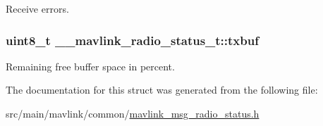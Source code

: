 Receive errors. 

\hypertarget{struct____mavlink__radio__status__t_a8f9a9b8d333b127422cb8d5b8b2b1928}{
\subsubsection[{txbuf}]{\setlength{\rightskip}{0pt plus 5cm}uint8\+\_\+t \+\_\+\+\_\+mavlink\+\_\+radio\+\_\+status\+\_\+t\+::txbuf}}\label{struct____mavlink__radio__status__t_a8f9a9b8d333b127422cb8d5b8b2b1928}


Remaining free buffer space in percent. 



The documentation for this struct was generated from the following file\+:\begin{DoxyCompactItemize}
\item 
src/main/mavlink/common/\hyperlink{mavlink__msg__radio__status_8h}{mavlink\+\_\+msg\+\_\+radio\+\_\+status.\+h}\end{DoxyCompactItemize}
